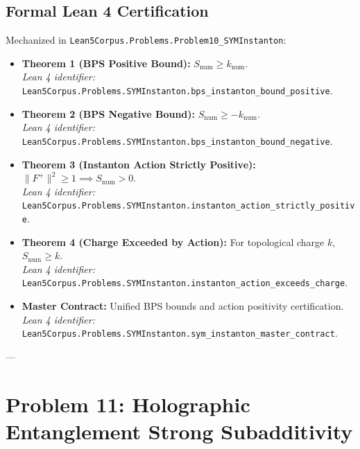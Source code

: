 \documentclass[11pt,a4paper]{article}
\begin{document}
\subsection{Formal Lean 4 Certification}
Mechanized in \texttt{Lean5Corpus.Problems.Problem10\_SYMInstanton}:
\begin{itemize}
    \item \textbf{Theorem 1 (BPS Positive Bound):} $S_{\mathrm{num}} \ge k_{\mathrm{num}}$. \\
    \textit{Lean 4 identifier:} \texttt{Lean5Corpus.Problems.SYMInstanton.bps\_instanton\_bound\_positive}.
    \item \textbf{Theorem 2 (BPS Negative Bound):} $S_{\mathrm{num}} \ge -k_{\mathrm{num}}$. \\
    \textit{Lean 4 identifier:} \texttt{Lean5Corpus.Problems.SYMInstanton.bps\_instanton\_bound\_negative}.
    \item \textbf{Theorem 3 (Instanton Action Strictly Positive):} $\|F^+\|^2 \ge 1 \implies S_{\mathrm{num}} > 0$. \\
    \textit{Lean 4 identifier:} \texttt{Lean5Corpus.Problems.SYMInstanton.instanton\_action\_strictly\_positive}.
    \item \textbf{Theorem 4 (Charge Exceeded by Action):} For topological charge $k$, $S_{\mathrm{num}} \ge k$. \\
    \textit{Lean 4 identifier:} \texttt{Lean5Corpus.Problems.SYMInstanton.instanton\_action\_exceeds\_charge}.
    \item \textbf{Master Contract:} Unified BPS bounds and action positivity certification. \\
    \textit{Lean 4 identifier:} \texttt{Lean5Corpus.Problems.SYMInstanton.sym\_instanton\_master\_contract}.
\end{itemize}

---

\section{Problem 11: Holographic Entanglement Strong Subadditivity}
\end{document}
